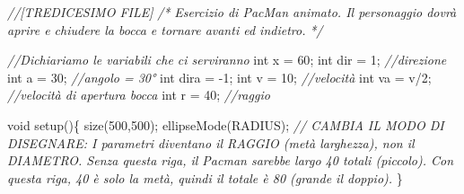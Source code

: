 \documentclass[
]{article}
\newenvironment{Shaded}{}{}
\newcommand{\CommentTok}[1]{\textcolor[rgb]{0.38,0.63,0.69}{\textit{#1}}}
\newcommand{\DataTypeTok}[1]{\textcolor[rgb]{0.56,0.13,0.00}{#1}}
\newcommand{\DecValTok}[1]{\textcolor[rgb]{0.25,0.63,0.44}{#1}}
\newcommand{\FunctionTok}[1]{\textcolor[rgb]{0.02,0.16,0.49}{#1}}
\newcommand{\NormalTok}[1]{#1}
\newcommand{\OperatorTok}[1]{\textcolor[rgb]{0.40,0.40,0.40}{#1}}
\begin{document}
\begin{Shaded}
\begin{Highlighting}[]
\CommentTok{//[TREDICESIMO FILE]}
\CommentTok{/*}
\CommentTok{    Esercizio di PacMan animato. Il personaggio dovrà aprire e chiudere la bocca e tornare avanti ed indietro.}
\CommentTok{*/}

\CommentTok{//Dichiariamo le variabili che ci serviranno}
\DataTypeTok{int}\NormalTok{ x }\OperatorTok{=} \DecValTok{60}\OperatorTok{;}
\DataTypeTok{int}\NormalTok{ dir }\OperatorTok{=} \DecValTok{1}\OperatorTok{;} \CommentTok{//direzione}
\DataTypeTok{int}\NormalTok{ a }\OperatorTok{=} \DecValTok{30}\OperatorTok{;} \CommentTok{//angolo = 30°}
\DataTypeTok{int}\NormalTok{ dira }\OperatorTok{=} \OperatorTok{{-}}\DecValTok{1}\OperatorTok{;}
\DataTypeTok{int}\NormalTok{ v }\OperatorTok{=} \DecValTok{10}\OperatorTok{;} \CommentTok{//velocità}
\DataTypeTok{int}\NormalTok{ va }\OperatorTok{=}\NormalTok{ v}\OperatorTok{/}\DecValTok{2}\OperatorTok{;} \CommentTok{//velocità di apertura bocca}
\DataTypeTok{int}\NormalTok{ r }\OperatorTok{=} \DecValTok{40}\OperatorTok{;} \CommentTok{//raggio}

\DataTypeTok{void} \FunctionTok{setup}\OperatorTok{()\{}
    \FunctionTok{size}\OperatorTok{(}\DecValTok{500}\OperatorTok{,}\DecValTok{500}\OperatorTok{);}
    \FunctionTok{ellipseMode}\OperatorTok{(}\NormalTok{RADIUS}\OperatorTok{);}  \CommentTok{// CAMBIA IL MODO DI DISEGNARE: I parametri diventano il RAGGIO (metà larghezza), non il DIAMETRO. Senza questa riga, il Pacman sarebbe largo 40 totali (piccolo). Con questa riga, 40 è solo la metà, quindi il totale è 80 (grande il doppio).}
\OperatorTok{\}}


\end{Highlighting}
\end{Shaded}
\end{document}
